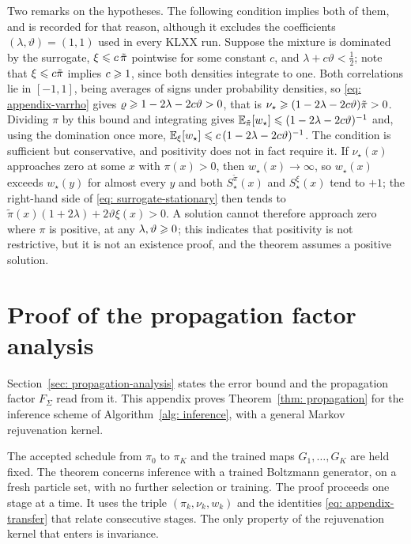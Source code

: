 \documentclass{article}
\begin{document}
\begin{remark}
\label{rem: appendix-domination}
Two remarks on the hypotheses. The following condition implies both of them, and is recorded for that reason, although it excludes the coefficients $(\lambda,\vartheta)=(1,1)$ used in every KLXX run. Suppose the mixture is dominated by the surrogate, $\xi\leqslant c\,\tilde\pi$ pointwise for some constant $c$, and $\lambda+c\vartheta<\tfrac12$; note that $\xi\leqslant c\tilde\pi$ implies $c\geqslant1$, since both densities integrate to one. Both correlations lie in $[-1,1]$, being averages of signs under probability densities, so \eqref{eq: appendix-varrho} gives $\varrho\geqslant1-2\lambda-2c\vartheta>0$, that is $\nu_\star\geqslant(1-2\lambda-2c\vartheta)\tilde\pi>0$. Dividing $\pi$ by this bound and integrating gives $\mathbb E_{\tilde\pi}[w_\star]\leqslant(1-2\lambda-2c\vartheta)^{-1}$ and, using the domination once more, $\mathbb E_{\xi}[w_\star]\leqslant c\,(1-2\lambda-2c\vartheta)^{-1}$. The condition is sufficient but conservative, and positivity does not in fact require it. If $\nu_\star(x)$ approaches zero at some $x$ with $\pi(x)>0$, then $w_\star(x)\to\infty$, so $w_\star(x)$ exceeds $w_\star(y)$ for almost every $y$ and both $S^{\tilde\pi}_\star(x)$ and $S^{\xi}_\star(x)$ tend to $+1$; the right-hand side of \eqref{eq: surrogate-stationary} then tends to $\tilde\pi(x)(1+2\lambda)+2\vartheta\xi(x)>0$. A solution cannot therefore approach zero where $\pi$ is positive, at any $\lambda,\vartheta\geqslant0$; this indicates that positivity is not restrictive, but it is not an existence proof, and the theorem assumes a positive solution.
\end{remark}


\section{Proof of the propagation factor analysis}
\label{sec: appendix-propagation}

Section~\ref{sec: propagation-analysis} states the error bound and the propagation factor $F_\Sigma$ read from it. This appendix proves Theorem~\ref{thm: propagation} for the inference scheme of Algorithm~\ref{alg: inference}, with a general Markov rejuvenation kernel.

The accepted schedule from $\pi_0$ to $\pi_K$ and the trained maps $G_1,\dots,G_K$ are held fixed. The theorem concerns inference with a trained Boltzmann generator, on a fresh particle set, with no further selection or training. The proof proceeds one stage at a time. It uses the triple $(\pi_k,\nu_k,w_k)$ and the identities \eqref{eq: appendix-transfer} that relate consecutive stages. The only property of the rejuvenation kernel that enters is invariance.
\end{document}
